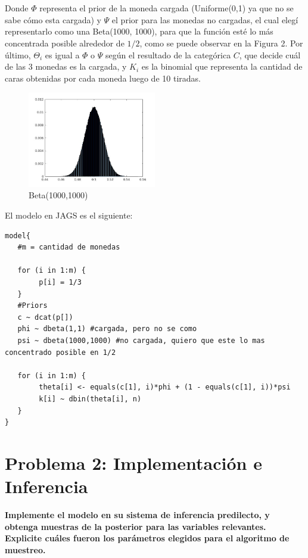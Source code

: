 ~\\ \\

Donde $\Phi$ representa el prior de la moneda cargada (Uniforme(0,1) ya que no se sabe cómo esta cargada) y $\Psi$ el prior para las monedas no cargadas, el cual elegí representarlo
como una Beta(1000, 1000), para que la función esté lo más concentrada posible alrededor de $1/2$, como se puede observar en la Figura 2. Por último, $\Theta_{i}$ es igual a $\Phi$ o $\Psi$ según
el resultado de la categórica $C$, que decide cuál de las 3 monedas es la cargada, y $K_{i}$ es la binomial que representa la cantidad de caras obtenidas por cada moneda luego de 10 tiradas.

\begin{figure}[h!]
  \centering
    \includegraphics[width=0.5\textwidth]{imagenes/beta-1000-1000.jpg}
  \caption{Beta(1000,1000)}
\end{figure}


\newpage
El modelo en JAGS es el siguiente:
\begin{verbatim}
model{
   #m = cantidad de monedas

   for (i in 1:m) {
   		p[i] = 1/3
   }
   #Priors
   c ~ dcat(p[])
   phi ~ dbeta(1,1) #cargada, pero no se como
   psi ~ dbeta(1000,1000) #no cargada, quiero que este lo mas concentrado posible en 1/2

   for (i in 1:m) {
   		theta[i] <- equals(c[1], i)*phi + (1 - equals(c[1], i))*psi
   		k[i] ~ dbin(theta[i], n)
   }
}
\end{verbatim}

\newpage
\section{Problema 2: Implementación e Inferencia}

\textbf{Implemente el modelo en su sistema de inferencia predilecto, y obtenga muestras de la posterior para las variables relevantes. Explicite cuáles fueron los parámetros
elegidos para el algoritmo de muestreo.}

